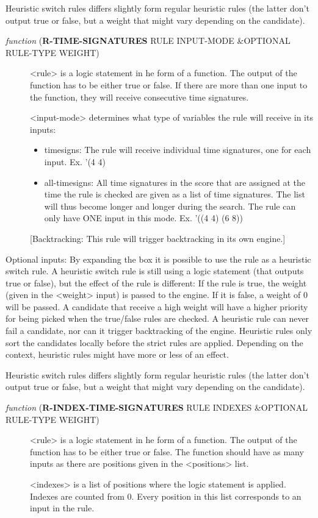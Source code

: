 Heuristic switch rules differs slightly form regular heuristic rules (the 
latter don't output true or false, but a weight that might vary depending
on the candidate).


\begin{description}
\item[{ \emph{function} (\textbf{R-TIME-SIGNATURES} RULE INPUT-MODE \&OPTIONAL RULE-TYPE WEIGHT)}] <rule> is a logic statement in he form of a function. The output of the 
function has to be either true or false. If there are more than one 
input to the function, they will receive consecutive time signatures.

<input-mode> determines what type of variables the rule will receive in 
its inputs:
\begin{itemize}
\item timesigns: The rule will receive individual time signatures, one for 
each input. Ex. '(4 4)
\item all-timesigns: All time signatures in the score that are assigned at the
time the rule is checked are given as a list of time   
signatures. The list will thus become longer and longer 
during the search. The rule can only have ONE input in 
this mode. Ex. '((4 4) (6 8))
\end{itemize}
[Backtracking: This rule will trigger backtracking in its own engine.]
\end{description}


Optional inputs:
By expanding the box it is possible to use the rule as a heuristic switch 
rule. A heuristic switch rule is still using a logic statement (that 
outputs true or false), but the effect of the rule is different: If the rule 
is true, the weight (given in the <weight> input) is passed to the engine. 
If it is false, a weight of 0 will be passed. A candidate that receive a 
high weight will have a higher priority for being picked when the true/false 
rules are checked. A heuristic rule can never fail a candidate, nor can it 
trigger backtracking of the engine. Heuristic rules only sort the 
candidates locally before the strict rules are applied. Depending on the 
context, heuristic rules might have more or less of an effect. 

Heuristic switch rules differs slightly form regular heuristic rules (the 
latter don't output true or false, but a weight that might vary depending
on the candidate).



\begin{description}
\item[{ \emph{function} (\textbf{R-INDEX-TIME-SIGNATURES} RULE INDEXES \&OPTIONAL RULE-TYPE WEIGHT)}] <rule> is a logic statement in he form of a function. The output of the 
function has to be either true or false. The function should have as many 
inputs as there are positions given in the <positions> list.

<indexes> is a list of positions where the logic statement is applied.
Indexes are counted from 0. Every position in this list corresponds to
an input in the rule.
\end{description}



